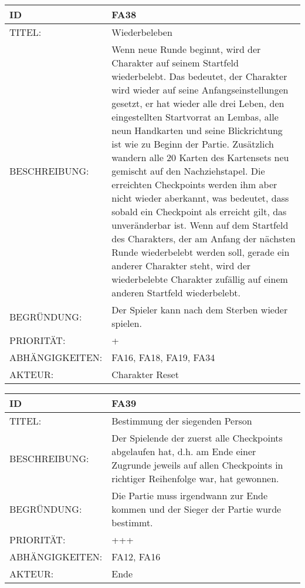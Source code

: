 \documentclass{uulm-assignment}
\begin{document}
    \begin{tabularx}{\textwidth}{|l|X |} \hline
        \textbf{ID} & \textbf{FA38} \\
        \hline
        TITEL: & Wiederbeleben\\
        \hline
        BESCHREIBUNG: & Wenn neue Runde beginnt, wird der Charakter auf seinem Startfeld wiederbelebt. Das bedeutet, der Charakter wird wieder auf seine Anfangseinstellungen gesetzt, er hat wieder alle drei Leben, den eingestellten Startvorrat an Lembas, alle neun Handkarten und
seine Blickrichtung ist wie zu Beginn der Partie. Zusätzlich wandern alle 20 Karten des Kartensets
neu gemischt auf den Nachziehstapel. Die erreichten Checkpoints werden ihm aber nicht wieder
aberkannt, was bedeutet, dass sobald ein Checkpoint als erreicht gilt, das unveränderbar ist.
\newline Wenn auf dem Startfeld des Charakters, der am Anfang der nächsten Runde wiederbelebt werden
soll, gerade ein anderer Charakter steht, wird der wiederbelebte Charakter zufällig auf einem anderen
Startfeld wiederbelebt.
        \\
        \hline
        BEGRÜNDUNG: & Der Spieler kann nach dem Sterben wieder spielen. \\
        \hline
        PRIORITÄT: & +\\
        \hline
        ABHÄNGIGKEITEN: & FA16, FA18, FA19, FA34\\
        \hline
        AKTEUR: & Charakter Reset\\
        \hline
    \end{tabularx}
    
    \begin{tabularx}{\textwidth}{|l|X |} \hline
        \textbf{ID} & \textbf{FA39} \\
        \hline
        TITEL: & Bestimmung der siegenden Person \\
        \hline
        BESCHREIBUNG: & Der Spielende der zuerst alle Checkpoints abgelaufen hat, d.h. am Ende einer Zugrunde jeweils auf
allen Checkpoints in richtiger Reihenfolge war, hat gewonnen.
        \\
        \hline
        BEGRÜNDUNG: & Die Partie muss irgendwann zur Ende kommen und der Sieger der Partie wurde bestimmt.\\
        \hline
        PRIORITÄT: & +++\\
        \hline
        ABHÄNGIGKEITEN: & FA12, FA16 \\
        \hline
        AKTEUR: & Ende\\
        \hline
    \end{tabularx}
    
\end{document}
